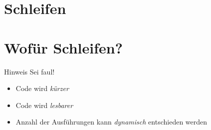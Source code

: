 




\section{Schleifen}
\subtitle{Kapitel 4: Befehle wiederholen}
\maketitle


\section{Wofür Schleifen?}
\begin{frame}
	\slidehead

\end{frame}

\begin{frame}
	\slidehead

	\pause
	\begin{block}{Hinweis}
		Sei faul!
	\end{block}
\end{frame}

\begin{frame}
	\slidehead

	\begin{itemize}
		\item Code wird \textit{kürzer}
		\item Code wird \textit{lesbarer}
		\item Anzahl der Ausführungen kann \textit{dynamisch} entschieden werden
	\end{itemize}
\end{frame}

